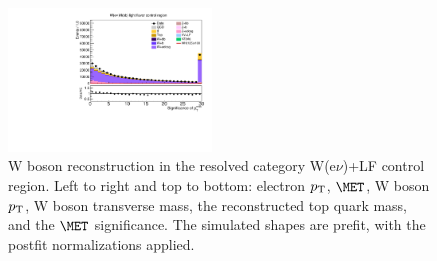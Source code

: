 \begin{figure}[tbp]
\begin{center}
    \includegraphics[width=0.48\textwidth]{figures/wlnhbb2016/resolved/WenWHLightFlavorCR_pfmetsig.pdf}
    \caption{W boson reconstruction in the resolved category W(e$\nu$)+LF control region.
    Left to right and top to bottom: electron $p_{\mathrm{T}}$, $\MET$, W boson $p_{\mathrm{T}}$, W boson transverse mass,
    the reconstructed top quark mass, and the $\MET$ significance.
    The simulated shapes are prefit, with the postfit normalizations applied.}
    \label{fig:res_WenLF_WBosons}
  \end{center}
\end{figure}
\clearpage

